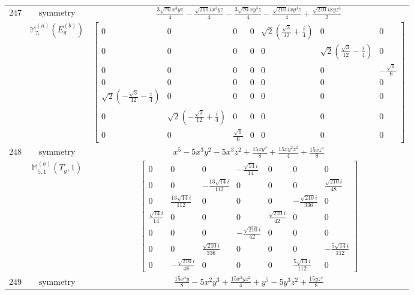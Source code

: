 \documentclass[fleqn,8pt,landscape]{jsarticle}
\begin{document}
\begin{longtable}{ccc}
$ 247 $ & $ \text{symmetry} $ & $ \frac{3 \sqrt{70} x^{3} y z}{4} - \frac{\sqrt{210} i x^{3} y z}{4} - \frac{3 \sqrt{70} x y^{3} z}{4} - \frac{\sqrt{210} i x y^{3} z}{4} + \frac{\sqrt{210} i x y z^{3}}{2} $ \\
$  $ & $ \mathbb{M}_{5}^{(a)}(E_{g}^{(b)}) $ & $ \begin{bmatrix} 0 & 0 & 0 & 0 & \sqrt{2} \left(\frac{\sqrt{3}}{12} + \frac{i}{4}\right) & 0 & 0 \\ 0 & 0 & 0 & 0 & 0 & \sqrt{2} \left(\frac{\sqrt{3}}{12} - \frac{i}{4}\right) & 0 \\ 0 & 0 & 0 & 0 & 0 & 0 & - \frac{\sqrt{6}}{6} \\ 0 & 0 & 0 & 0 & 0 & 0 & 0 \\ \sqrt{2} \left(- \frac{\sqrt{3}}{12} - \frac{i}{4}\right) & 0 & 0 & 0 & 0 & 0 & 0 \\ 0 & \sqrt{2} \left(- \frac{\sqrt{3}}{12} + \frac{i}{4}\right) & 0 & 0 & 0 & 0 & 0 \\ 0 & 0 & \frac{\sqrt{6}}{6} & 0 & 0 & 0 & 0 \end{bmatrix} $ \\ \hline
$ 248 $ & $ \text{symmetry} $ & $ x^{5} - 5 x^{3} y^{2} - 5 x^{3} z^{2} + \frac{15 x y^{4}}{8} + \frac{15 x y^{2} z^{2}}{4} + \frac{15 x z^{4}}{8} $ \\
$  $ & $ \mathbb{M}_{5,1}^{(a)}(T_{g},1) $ & $ \begin{bmatrix} 0 & 0 & 0 & - \frac{\sqrt{14} i}{14} & 0 & 0 & 0 \\ 0 & 0 & - \frac{13 \sqrt{14} i}{112} & 0 & 0 & 0 & \frac{\sqrt{210} i}{48} \\ 0 & \frac{13 \sqrt{14} i}{112} & 0 & 0 & 0 & - \frac{\sqrt{210} i}{336} & 0 \\ \frac{\sqrt{14} i}{14} & 0 & 0 & 0 & \frac{\sqrt{210} i}{42} & 0 & 0 \\ 0 & 0 & 0 & - \frac{\sqrt{210} i}{42} & 0 & 0 & 0 \\ 0 & 0 & \frac{\sqrt{210} i}{336} & 0 & 0 & 0 & - \frac{5 \sqrt{14} i}{112} \\ 0 & - \frac{\sqrt{210} i}{48} & 0 & 0 & 0 & \frac{5 \sqrt{14} i}{112} & 0 \end{bmatrix} $ \\ \hline
$ 249 $ & $ \text{symmetry} $ & $ \frac{15 x^{4} y}{8} - 5 x^{2} y^{3} + \frac{15 x^{2} y z^{2}}{4} + y^{5} - 5 y^{3} z^{2} + \frac{15 y z^{4}}{8} $ \\

\end{longtable}
\end{document}
